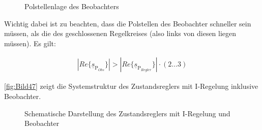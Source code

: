 \begin{figure}[H]
    \centering
    \caption[Polstellen des Beobachters]{Polstellenlage des Beobachters}
    \label{fig:Bild46}
\end{figure}

Wichtig dabei ist zu beachten, dass die Polstellen des Beobachter schneller sein müssen, als die des geschlossenen Regelkreises (also links von diesen liegen müssen). Es gilt:

\begin{align}
    \left| Re\{ \underline{s}_{\mathrm{P}_{Obs}}\}\right| > \left| Re\{ \underline{s}_{\mathrm{P}_{Regler}}\}\right| \cdot (2 ... 3)
\end{align}

\autoref{fig:Bild47} zeigt die Systemstruktur des Zustandsreglers mit I-Regelung inklusive Beobachter.

\begin{figure}[H]
    \centering
    \caption[Reglerstruktur mit Beobachter]{Schematische Darstellung des Zustandsreglers mit I-Regelung und Beobachter}
    \label{fig:Bild47}
\end{figure}

